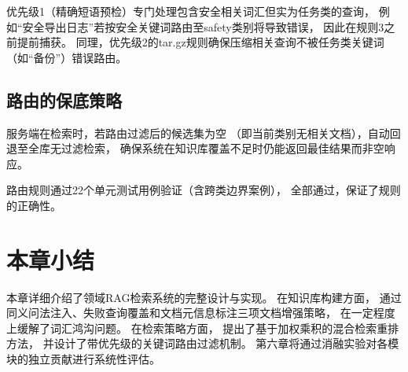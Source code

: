 优先级1（精确短语预检）专门处理包含安全相关词汇但实为任务类的查询，
例如“安全导出日志”若按安全关键词路由至safety类别将导致错误，
因此在规则3之前提前捕获。
同理，优先级2的tar.gz规则确保压缩相关查询不被任务类关键词（如“备份”）错误路由。

\subsection{路由的保底策略}

服务端在检索时，若路由过滤后的候选集为空
（即当前类别无相关文档），自动回退至全库无过滤检索，
确保系统在知识库覆盖不足时仍能返回最佳结果而非空响应。

路由规则通过22个单元测试用例验证（含跨类边界案例），
全部通过，保证了规则的正确性。

\section{本章小结}

本章详细介绍了领域RAG检索系统的完整设计与实现。
在知识库构建方面，
通过同义问法注入、失败查询覆盖和文档元信息标注三项文档增强策略，
在一定程度上缓解了词汇鸿沟问题。
在检索策略方面，
提出了基于加权乘积的混合检索重排方法，
并设计了带优先级的关键词路由过滤机制。
第六章将通过消融实验对各模块的独立贡献进行系统性评估。


